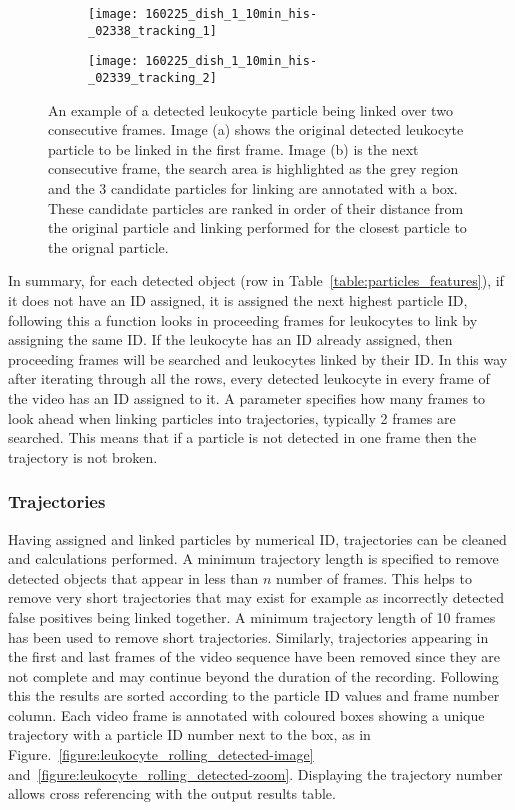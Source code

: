 \begin{figure}[htbp]{}
	\centering
	\begin{subfigure}[b]{0.49\linewidth}
		\texttt{[image: 160225\_dish\_1\_10min\_his-\_02338\_tracking\_1]}
		\caption{}
		\label{figure:video_processing:particle_linking_1}
	\end{subfigure}
	\begin{subfigure}[b]{0.49\linewidth}
		\texttt{[image: 160225\_dish\_1\_10min\_his-\_02339\_tracking\_2]}
		\caption{}
		\label{figure:video_processing:particle_linking_2}
	\end{subfigure}
\caption[Leukocyte particle linking]{An example of a detected leukocyte particle being linked over two consecutive frames. Image (a) shows the original detected leukocyte particle to be linked in the first frame. Image (b) is the next consecutive frame, the search area is highlighted as the grey region and the 3 candidate particles for linking are annotated with a box. These candidate particles are ranked in order of their distance from the original particle and linking performed for the closest particle to the orignal particle.}
\label{figure:video_processing:particle_linking}
\end{figure}

In summary, for each detected object (row in Table~\ref{table:particles_features}), if it does not have an ID assigned, it is assigned the next highest particle ID, following this a function looks in proceeding frames for leukocytes to link by assigning the same ID. If the leukocyte has an ID already assigned, then proceeding frames will be searched and leukocytes linked by their ID. In this way after iterating through all the rows, every detected leukocyte in every frame of the video has an ID assigned to it. A parameter specifies how many frames to look ahead when linking particles into trajectories, typically 2 frames are searched. This means that if a particle is not detected in one frame then the trajectory is not broken.

\subsubsection{Trajectories}
Having assigned and linked particles by numerical ID, trajectories can be cleaned and calculations performed. A minimum trajectory length is specified to remove detected objects that appear in less than $n$ number of frames. This helps to remove very short trajectories that may exist for example as incorrectly detected false positives being linked together. A minimum trajectory length of 10 frames has been used to remove short trajectories. Similarly, trajectories appearing in the first and last frames of the video sequence have been removed since they are not complete and may continue beyond the duration of the recording. Following this the results are sorted according to the particle ID values and frame number column. Each video frame is annotated with coloured boxes showing a unique trajectory with a particle ID number next to the box, as in Figure.~\ref{figure:leukocyte_rolling_detected-image} and~\ref{figure:leukocyte_rolling_detected-zoom}. Displaying the trajectory number allows cross referencing with the output results table.

